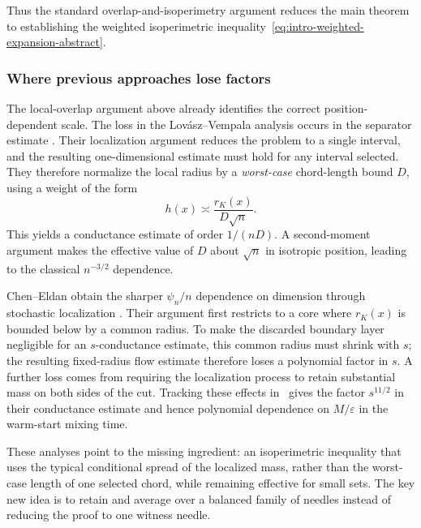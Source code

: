 \documentclass[11pt]{article}
\theoremstyle{definition}
\theoremstyle{remark}
\begin{document}
Thus the standard overlap-and-isoperimetry argument reduces the main theorem to establishing the weighted isoperimetric inequality~\eqref{eq:intro-weighted-expansion-abstract}.


\subsubsection{Where previous approaches lose factors}\label{sec:tech_ov_previous}
The local-overlap argument above already identifies the correct position-dependent scale. The loss in the Lov\'asz--Vempala analysis occurs in the separator estimate \cite{LV}.  Their localization argument reduces the problem to a single interval, and the resulting one-dimensional estimate must hold for any interval selected.  They therefore normalize the local radius by a \emph{worst-case} chord-length bound $D$, using a weight of the form
\[
 h(x)\asymp\frac{r_K(x)}{D\sqrt n}.
\]
This yields a conductance estimate of order $1/(nD)$.  A second-moment argument makes the effective value of $D$ about $\sqrt n$ in isotropic position, leading to the classical $n^{-3/2}$ dependence.  

Chen--Eldan obtain the sharper $\psi_n/n$ dependence on dimension through stochastic localization \cite{CE}.  Their argument first restricts to a core where $r_K(x)$ is bounded below by a common radius.  To make the discarded boundary layer negligible for an $s$-conductance estimate, this common radius must shrink with $s$; the resulting fixed-radius flow estimate therefore loses a polynomial factor in $s$.  A further loss comes from requiring the localization process to retain substantial mass on both sides of the cut. Tracking these effects in~\cite{CE} gives the factor $s^{11/2}$ in their conductance estimate and hence polynomial dependence on $M/\varepsilon$ in the warm-start mixing time.

These analyses point to the missing ingredient: an isoperimetric inequality that uses the typical conditional spread of the localized mass, rather than the worst-case length of one selected chord, while remaining effective for small sets. The key new idea is to retain and average over a balanced family of needles instead of reducing the proof to one witness needle.


\end{document}
